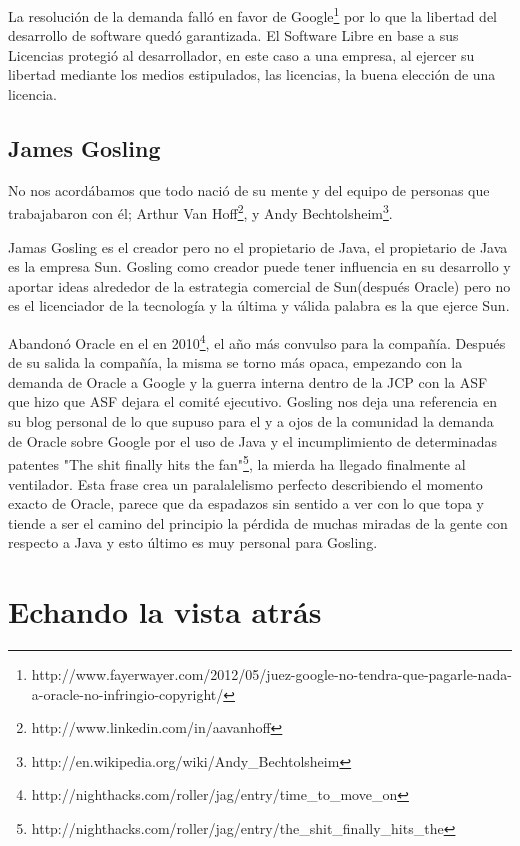 \documentclass[11pt]{scrartcl}
\begin{document}
La resolución de la demanda falló en favor de Google\footnote{http://www.fayerwayer.com/2012/05/juez-google-no-tendra-que-pagarle-nada-a-oracle-no-infringio-copyright/} por lo que la libertad del desarrollo de software quedó garantizada. El Software Libre en base a sus Licencias protegió al desarrollador, en este caso a una empresa, al ejercer su libertad mediante los medios estipulados, las licencias, la buena elección de una licencia.

\subsection{James Gosling}

No nos acordábamos que todo nació de su mente y del equipo de personas que trabajabaron con él; Arthur Van Hoff\footnote{http://www.linkedin.com/in/aavanhoff}, y Andy Bechtolsheim\footnote{http://en.wikipedia.org/wiki/Andy\_Bechtolsheim}.

Jamas Gosling es el creador pero no el propietario de Java, el propietario de Java es la empresa Sun. Gosling como creador puede tener influencia en su desarrollo y aportar ideas alrededor de la estrategia comercial de Sun(después Oracle) pero no es el licenciador de la tecnología y la última y válida palabra es la que ejerce Sun.

Abandonó Oracle en el en 2010\footnote{http://nighthacks.com/roller/jag/entry/time\_to\_move\_on}, el año más convulso para la compañía. Después de su salida la compañía, la misma se torno más opaca, empezando con la demanda de Oracle a Google y la guerra interna dentro de la JCP con la ASF que hizo que ASF dejara el comité ejecutivo. Gosling nos deja una referencia en su blog personal de lo que supuso para el y a ojos de la comunidad la demanda de Oracle sobre Google por el uso de Java y el incumplimiento de determinadas patentes "The shit finally hits the fan"\footnote{http://nighthacks.com/roller/jag/entry/the\_shit\_finally\_hits\_the}, la mierda ha llegado finalmente al ventilador. Esta frase crea un paralalelismo perfecto describiendo el momento exacto de Oracle, parece que da espadazos sin sentido a ver con lo que topa y tiende a ser el camino del principio la pérdida de muchas miradas de la gente con respecto a Java y esto último es muy personal para Gosling.

\section{Echando la vista atrás}
\end{document}

